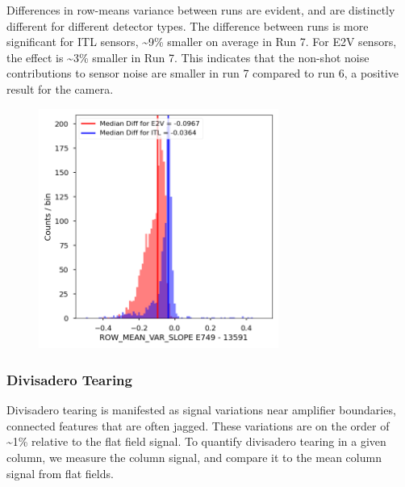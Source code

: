 Differences in row-means variance between runs are evident, and are distinctly different for different detector types. The difference between runs is more significant for ITL sensors, \textasciitilde9\% smaller on average in Run 7. For E2V sensors, the effect is \textasciitilde3\% smaller in Run 7. This indicates that the non-shot noise contributions to sensor noise are smaller in run 7 compared to run 6, a positive result for the camera.

\begin{figure}[H]
\begin{centering}
\includegraphics[width=0.7\textwidth]{figures/baselineCharacterization/ROW_MEAN_VAR_SLOPE_13591_E749_diff.png}
\end{centering}
\end{figure}

\subsubsection{Divisadero Tearing}\label{divisadero-tearing}

Divisadero tearing is manifested as signal variations near amplifier boundaries, connected features that are often jagged. These variations are on the order of \textasciitilde1\% relative to the flat field signal. To quantify divisadero tearing in a given column, we measure the column signal, and compare it to the mean column signal from flat fields.

